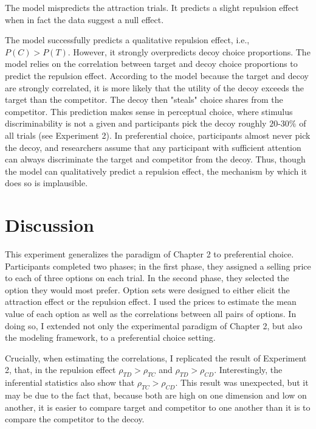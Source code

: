 The model mispredicts the attraction trials. It predicts a slight repulsion effect when in fact the data suggest a null effect.

The model successfully predicts a qualitative repulsion effect, i.e., $P(C)>P(T)$. However, it strongly overpredicts decoy choice proportions. The model relies on the correlation between target and decoy choice proportions to predict the repulsion effect. According to the model because the target and decoy are strongly correlated, it is more likely that the utility of the decoy exceeds the target than the competitor. The decoy then "steals" choice shares from the competitor. This prediction makes sense in perceptual choice, where stimulus discriminability is not a given and participants pick the decoy roughly $20$-$30\%$ of all trials (see Experiment 2). In preferential choice, participants almost never pick the decoy, and researchers assume that any participant with sufficient attention can always discriminate the target and competitor from the decoy. Thus, though the model can qualitatively predict a repulsion effect, the mechanism by which it does so is implausible.

\section{Discussion}

This experiment generalizes the paradigm of Chapter 2 to preferential choice. Participants completed two phases; in the first phase, they assigned a selling price to each of three options on each trial. In the second phase, they selected the option they would most prefer. Option sets were designed to either elicit the attraction effect or the repulsion effect. I used the prices to estimate the mean value of each option as well as the correlations between all pairs of options. In doing so, I extended not only the experimental paradigm of Chapter 2, but also the modeling framework, to a preferential choice setting.

Crucially, when estimating the correlations, I replicated the result of Experiment 2, that, in the repulsion effect $\rho_{TD}>\rho_{TC}$ and $\rho_{TD}>\rho_{CD}$. Interestingly, the inferential statistics also show that $\rho_{TC}>\rho_{CD}$. This result was unexpected, but it may be due to the fact that, because both are high on one dimension and low on another, it is easier to compare target and competitor to one another than it is to compare the competitor to the decoy. 

